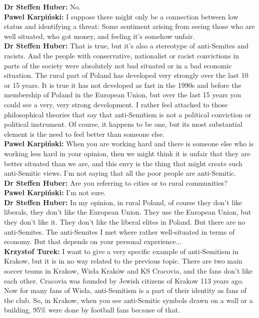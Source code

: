 \textbf{Dr Steffen Huber:} No.\\ 
\textbf{Pawel Karpiński:} I suppose there might only be a connection between low status and identifying a threat: Some sentiment arising from seeing those who are well situated, who got money, and feeling it's somehow unfair. \\  
\textbf{Dr Steffen Huber:} That is true, but it's also a stereotype of anti-Semites and racists. And the people with conservative, nationalist or racist convictions in parts of the society were absolutely not bad situated or in a bad economic situation. The rural part of Poland has developed very strongly over the last 10 or 15 years. It is true it has not developed as fast in the 1990s and before the membership of Poland in the European Union, but over the last 15 years you could see a very, very strong development. I rather feel attached to those philosophical theories that say that anti-Semitism is not a political conviction or political instrument. Of course, it happens to be one, but its most substantial element is the need to feel better than someone else. \\  
\textbf{Pawel Karpiński:} When you are working hard and there is someone else who is working less hard in your opinion, then we might think it is unfair that they are better situated than we are, and this envy is the thing that might create such anti-Semitic views. I’m not saying that all the poor people are anti-Semitic.\\  
\textbf{Dr Steffen Huber:} Are you referring to cities or to rural communities? \\
\textbf{Pawel Karpiński:} I'm not sure.\\ 
\textbf{Dr Steffen Huber:} In my opinion, in rural Poland, of course they don't like liberals, they don't like the European Union. They use the European Union, but they don't like it. They don't like the liberal elites in Poland. But there are no anti-Semites. The anti-Semites I met where rather well-situated in terms of economy. But that depends on your personal experience...\\
\textbf{Krzystof Turek:} I want to give a very specific example of anti-Semitism in Krakow, but it is in no way related to the previous topic. There are two main soccer teams in Krakow, Wisła Kraków and KS Cracovia, and the fans don't like each other. Cracovia was founded by Jewish citizens of Krakow 113 years ago. Now for many fans of Wisła, anti-Semitism is a part of their identity as fans of the club. So, in Krakow, when you see anti-Semitic symbols drawn on a wall or a building, 95\% were done by football fans because of that. 

